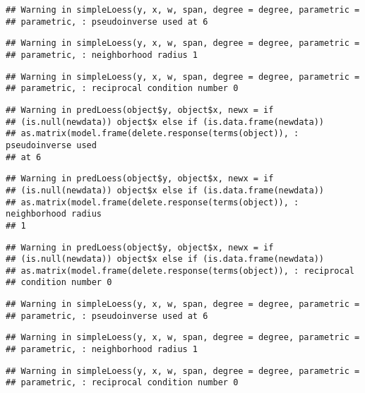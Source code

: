 \documentclass[]{article}
\begin{document}
\begin{verbatim}
## Warning in simpleLoess(y, x, w, span, degree = degree, parametric =
## parametric, : pseudoinverse used at 6
\end{verbatim}

\begin{verbatim}
## Warning in simpleLoess(y, x, w, span, degree = degree, parametric =
## parametric, : neighborhood radius 1
\end{verbatim}

\begin{verbatim}
## Warning in simpleLoess(y, x, w, span, degree = degree, parametric =
## parametric, : reciprocal condition number 0
\end{verbatim}

\begin{verbatim}
## Warning in predLoess(object$y, object$x, newx = if
## (is.null(newdata)) object$x else if (is.data.frame(newdata))
## as.matrix(model.frame(delete.response(terms(object)), : pseudoinverse used
## at 6
\end{verbatim}

\begin{verbatim}
## Warning in predLoess(object$y, object$x, newx = if
## (is.null(newdata)) object$x else if (is.data.frame(newdata))
## as.matrix(model.frame(delete.response(terms(object)), : neighborhood radius
## 1
\end{verbatim}

\begin{verbatim}
## Warning in predLoess(object$y, object$x, newx = if
## (is.null(newdata)) object$x else if (is.data.frame(newdata))
## as.matrix(model.frame(delete.response(terms(object)), : reciprocal
## condition number 0
\end{verbatim}

\begin{verbatim}
## Warning in simpleLoess(y, x, w, span, degree = degree, parametric =
## parametric, : pseudoinverse used at 6
\end{verbatim}

\begin{verbatim}
## Warning in simpleLoess(y, x, w, span, degree = degree, parametric =
## parametric, : neighborhood radius 1
\end{verbatim}

\begin{verbatim}
## Warning in simpleLoess(y, x, w, span, degree = degree, parametric =
## parametric, : reciprocal condition number 0
\end{verbatim}
\end{document}
